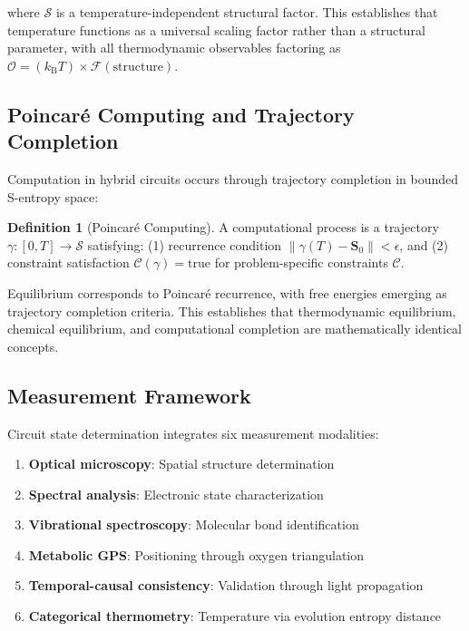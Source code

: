 \documentclass[12pt,a4paper]{article}
\theoremstyle{plain}
\theoremstyle{definition}
\newtheorem{definition}[theorem]{Definition}
\theoremstyle{remark}
\newcommand{\kB}{k_{\mathrm{B}}}
\newcommand{\Sspace}{\mathcal{S}}
\newcommand{\Scoord}{\mathbf{S}}
\begin{document}
where $\mathcal{S}$ is a temperature-independent structural factor. This establishes that temperature functions as a universal scaling factor rather than a structural parameter, with all thermodynamic observables factoring as $\mathcal{O} = (\kB T) \times \mathcal{F}(\text{structure})$.

\subsection{Poincaré Computing and Trajectory Completion}

Computation in hybrid circuits occurs through trajectory completion in bounded S-entropy space:

\begin{definition}[Poincaré Computing]
\label{def:poincare_computing}
A computational process is a trajectory $\gamma: [0,T] \to \Sspace$ satisfying: (1) recurrence condition $\|\gamma(T) - \Scoord_0\| < \epsilon$, and (2) constraint satisfaction $\mathcal{C}(\gamma) = \text{true}$ for problem-specific constraints $\mathcal{C}$.
\end{definition}

Equilibrium corresponds to Poincaré recurrence, with free energies emerging as trajectory completion criteria. This establishes that thermodynamic equilibrium, chemical equilibrium, and computational completion are mathematically identical concepts.

\subsection{Measurement Framework}

Circuit state determination integrates six measurement modalities:

\begin{enumerate}
\item \textbf{Optical microscopy}: Spatial structure determination
\item \textbf{Spectral analysis}: Electronic state characterization  
\item \textbf{Vibrational spectroscopy}: Molecular bond identification
\item \textbf{Metabolic GPS}: Positioning through oxygen triangulation
\item \textbf{Temporal-causal consistency}: Validation through light propagation
\item \textbf{Categorical thermometry}: Temperature via evolution entropy distance
\end{enumerate}
\end{document}
